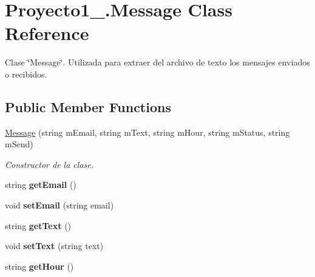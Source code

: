 \hypertarget{class_proyecto1__1096917_1_1_message}{}\section{Proyecto1\+\_.\+Message Class Reference}
\label{class_proyecto1__1096917_1_1_message}


Clase \char`\"{}\+Message\char`\"{}. Utilizada para extraer del archivo de texto los mensajes enviados o recibidos.  


\subsection*{Public Member Functions}
\begin{DoxyCompactItemize}
\item 
\mbox{\hyperlink{class_proyecto1__1096917_1_1_message_a12cecdedb00d6872604ed24e1b507ee1}{Message}} (string m\+Email, string m\+Text, string m\+Hour, string m\+Status, string m\+Send)
\begin{DoxyCompactList}\small\item\em Constructor de la clase. \end{DoxyCompactList}\item 
\mbox{\label{class_proyecto1__1096917_1_1_message_a0fb950348ba55b507661e51d587f1790}} 
string {\bfseries get\+Email} ()
\item 
\mbox{\label{class_proyecto1__1096917_1_1_message_ad022d2a23bdcaa1fdaed0a77b01c4e86}} 
void {\bfseries set\+Email} (string email)
\item 
\mbox{\label{class_proyecto1__1096917_1_1_message_a6a9c0e0b0a03d3c5114e31f2cb7d153f}} 
string {\bfseries get\+Text} ()
\item 
\mbox{\label{class_proyecto1__1096917_1_1_message_a8a0e53bb33cf7b8f5a9d163e43811999}} 
void {\bfseries set\+Text} (string text)
\item 
\mbox{\label{class_proyecto1__1096917_1_1_message_aff4aef6ba51891502e1845915af12918}} 
string {\bfseries get\+Hour} ()
\item 

\end{DoxyCompactItemize}
